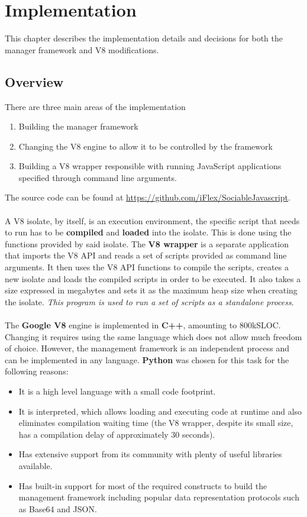 \documentclass{l4proj}
\begin{document}
\chapter{Implementation}
\hspace*{1em} This chapter describes the implementation details and decisions for both the manager framework and V8 modifications. 
\section{Overview}
\hspace*{1em} There are three main areas of the implementation
\begin{enumerate}
\item Building the manager framework
\item Changing the V8 engine to allow it to be controlled by the framework
\item Building a V8 wrapper responsible with running JavaScript applications specified through command line arguments.
\end{enumerate}
\hspace*{1em} The source code can be found at \url{https://github.com/iFlex/SociableJavascript}.
\\\\
\hspace*{1em} A V8 isolate, by itself, is an execution environment, the specific script that needs to run has to be \textbf{compiled} and \textbf{loaded} into the isolate. This is done using the functions provided by said isolate. The \textbf{V8 wrapper} is a separate application that imports the V8 API and reads a set of scripts provided as command line arguments. It then uses the V8 API functions to compile the scripts, creates a new isolate and loads the compiled scripts in order to be executed. It also takes a size expressed in megabytes and sets it as the maximum heap size when creating the isolate. \textit{This program is used to run a set of scripts as a standalone process}.
\\\\
\hspace*{1em} The \textbf{Google V8} engine is implemented in \textbf{C++}, amounting to 800kSLOC. Changing it requires using the same language which does not allow much freedom of choice. However, the management framework is an independent process and can be implemented in any language. \textbf{Python} was chosen for this task for the following reasons:
\begin{itemize}
\item It is a high level language with a small code footprint.
\item It is interpreted, which allows loading and executing code at runtime and also eliminates compilation waiting time (the V8 wrapper, despite its small size, has a compilation delay of approximately 30 seconds).
\item Has extensive support from its community with plenty of useful libraries available.
\item Has built-in support for most of the required constructs to build the management framework including popular data representation protocols such as Base64 and JSON.
\end{itemize}
\end{document}
